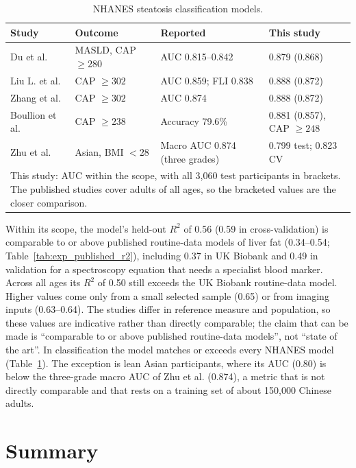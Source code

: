 \begin{table}[htbp]
\centering
\caption{NHANES steatosis classification models.}
\label{tab:exp_published_auc}
\begin{tabular}{p{3.6cm}p{2.9cm}p{3.2cm}p{4cm}}
\toprule
Study & Outcome & Reported & This study \\
\midrule
Du et al. \cite{du2026masld} & MASLD, CAP $\geq 280$ & AUC 0.815--0.842 & 0.879 (0.868) \\
Liu L. et al. \cite{liu2024automl} & CAP $\geq 302$ & AUC 0.859; FLI 0.838 & 0.888 (0.872) \\
Zhang et al. \cite{zhang2025masld} & CAP $\geq 302$ & AUC 0.874 & 0.888 (0.872) \\
Boullion et al. \cite{boullion2025biomarker} & CAP $\geq 238$ & Accuracy 79.6\% & 0.881 (0.857), CAP $\geq 248$ \\
Zhu et al. \cite{zhu2026nonobese} & Asian, BMI $<28$ & Macro AUC 0.874 (three grades) & 0.799 test; 0.823 CV \\
\bottomrule
\multicolumn{4}{p{14cm}}{\small This study: AUC within the scope, with all 3,060 test participants in brackets. The published studies cover adults of all ages, so the bracketed values are the closer comparison.}
\end{tabular}
\end{table}

Within its scope, the model's held-out $R^2$ of 0.56 (0.59 in
cross-validation) is comparable to or above published routine-data models of
liver fat (0.34--0.54; Table~\ref{tab:exp_published_r2}), including 0.37 in
UK Biobank and 0.49 in validation for a spectroscopy equation that needs a
specialist blood marker. Across all ages its $R^2$ of 0.50 still exceeds the UK
Biobank routine-data model. Higher values come only from a small selected
sample (0.65) or from imaging inputs (0.63--0.64). The studies differ in
reference measure and population, so these values are indicative rather than
directly comparable; the claim that can be made is ``comparable to or above
published routine-data models'', not ``state of the art''. In classification
the model matches or exceeds every NHANES model
(Table~\ref{tab:exp_published_auc}). The exception is lean Asian participants,
where its AUC (0.80) is below the three-grade macro AUC of Zhu et al. (0.874),
a metric that is not directly comparable and that rests on a training set of
about 150,000 Chinese adults.

\section{Summary}
\label{sec:exp_summary}

